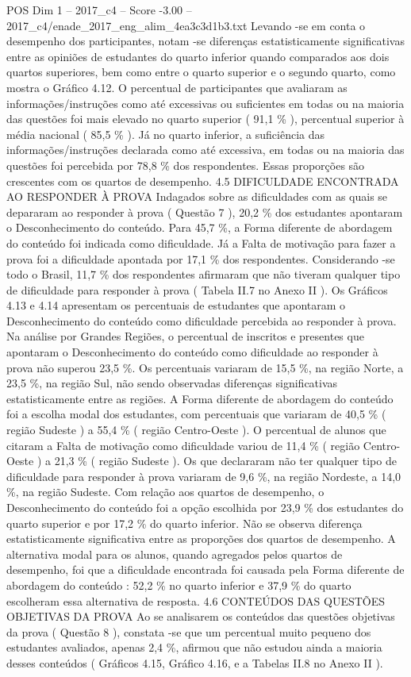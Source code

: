 \begin{textsample}{POS Dim 1 – 2017\_c4 – Score -3.00 – 2017\_c4/enade\_2017\_eng\_alim\_4ea3c3d1b3.txt}
Levando -se em conta o desempenho dos participantes, notam -se diferenças estatisticamente significativas entre as opiniões de estudantes do quarto inferior quando comparados aos dois quartos superiores, bem como entre o quarto superior e o segundo quarto, como mostra o Gráfico 4.12.
O percentual de participantes que avaliaram as informações/instruções como até excessivas ou suficientes em todas ou na maioria das questões foi mais elevado no quarto superior ( 91,1 \% ), percentual superior à média nacional ( 85,5 \% ).
Já no quarto inferior, a suficiência das informações/instruções declarada como até excessiva, em todas ou na maioria das questões foi percebida por 78,8 \% dos respondentes.
Essas proporções são crescentes com os quartos de desempenho. 4.5 DIFICULDADE ENCONTRADA AO RESPONDER À PROVA Indagados sobre as dificuldades com as quais se depararam ao responder à prova ( Questão 7 ), 20,2 \% dos estudantes apontaram o Desconhecimento do conteúdo.
Para 45,7 \%, a Forma diferente de abordagem do conteúdo foi indicada como dificuldade.
Já a Falta de motivação para fazer a prova foi a dificuldade apontada por 17,1 \% dos respondentes.
Considerando -se todo o Brasil, 11,7 \% dos respondentes afirmaram que não tiveram qualquer tipo de dificuldade para responder à prova ( Tabela II.7 no Anexo II ).
Os Gráficos 4.13 e 4.14 apresentam os percentuais de estudantes que apontaram o Desconhecimento do conteúdo como dificuldade percebida ao responder à prova.
Na análise por Grandes Regiões, o percentual de inscritos e presentes que apontaram o Desconhecimento do conteúdo como dificuldade ao responder à prova não superou 23,5 \%.
Os percentuais variaram de 15,5 \%, na região Norte, a 23,5 \%, na região Sul, não sendo observadas diferenças significativas estatisticamente entre as regiões.
A Forma diferente de abordagem do conteúdo foi a escolha modal dos estudantes, com percentuais que variaram de 40,5 \% ( região Sudeste ) a 55,4 \% ( região Centro-Oeste ).
O percentual de alunos que citaram a Falta de motivação como dificuldade variou de 11,4 \% ( região Centro-Oeste ) a 21,3 \% ( região Sudeste ).
Os que declararam não ter qualquer tipo de dificuldade para responder à prova variaram de 9,6 \%, na região Nordeste, a 14,0 \%, na região Sudeste.
Com relação aos quartos de desempenho, o Desconhecimento do conteúdo foi a opção escolhida por 23,9 \% dos estudantes do quarto superior e por 17,2 \% do quarto inferior.
Não se observa diferença estatisticamente significativa entre as proporções dos quartos de desempenho.
A alternativa modal para os alunos, quando agregados pelos quartos de desempenho, foi que a dificuldade encontrada foi causada pela Forma diferente de abordagem do conteúdo : 52,2 \% no quarto inferior e 37,9 \% do quarto escolheram essa alternativa de resposta. 4.6 CONTEÚDOS DAS QUESTÕES OBJETIVAS DA PROVA Ao se analisarem os conteúdos das questões objetivas da prova ( Questão 8 ), constata -se que um percentual muito pequeno dos estudantes avaliados, apenas 2,4 \%, afirmou que não estudou ainda a maioria desses conteúdos ( Gráficos 4.15, Gráfico 4.16, e a Tabelas II.8 no Anexo II ).

\end{textsample}
